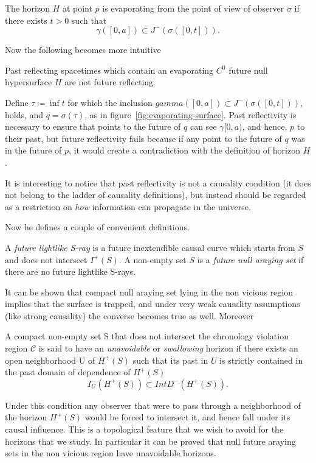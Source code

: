 	\begin{definition}
		The horizon \(H\) at point \(p\) is evaporating from the point of view of observer \(\sigma\) if there exists \(t > 0\) such that
		\[
		\gamma \left([0, a]\right) \subset J^-\left(\sigma\left([0, t]\right)\right).	
		\] 
	\end{definition}
	Now the following becomes more intuitive
	\begin{theorem}
		Past reflecting spacetimes which contain an evaporating \(C^0\) future null hypersurface \(H\) are not future reflecting.
	\end{theorem}
	Define \(\tau \coloneqq \inf t\) for which the inclusion \(gamma \left([0, a]\right) \subset J^-\left(\sigma\left([0, t]\right)\right)\), holds, and \(q = \sigma(\tau)\), as in figure~\ref{fig:evaporating-surface}.
	Past reflectivity is necessary to ensure that points to the future of \(q\) can see \(\gamma[0,a)\), and hence, \(p\) to their past, but future reflectivity fails because if any point to the future of \(q\) was in the future of \(p\), it would create a contradiction with the definition of horizon \(H\). 
	\begin{remark}
		It is interesting to notice that past reflectivity is not a causality condition (it does not belong to the ladder of causality definitions), but instead should be regarded as a restriction on \emph{how} information can propagate in the universe.
	\end{remark}

	Now he defines a couple of convenient definitions.
	\begin{definition}
		A \emph{future lightlike S-ray} is a future inextendible causal curve which starts from \(S\) and does not intersect \(I^+(S)\). A non-empty set \(S\) is a \emph{future null araying set} if there are no future lightlike S-rays. 
	\end{definition}
	It can be shown that compact null araying set lying in the non vicious region implies that the surface is trapped, and under very weak causality assumptions (like strong causality) the converse becomes true as well. Moreover
	\begin{definition}
		A compact non-empty set S that does not intersect the chronology violation region \(\mathcal{C}\) is said to have an \emph{unavoidable} or \emph{swallowing} horizon if there exists an open neighborhood U of \(H^+(S)\) such that its past in \(U\) is strictly contained in the past domain of dependence of \(H^+(S)\) 
		\[
			I^-_U(H^+(S)) \subset Int D^-(H^+(S)).	
		\]
	\end{definition}
	Under this condition any observer that were to pass through a neighborhood of the horizon \(H^+(S)\) would be forced to intersect it, and hence fall under its causal influence. This is a topological feature that we wish to avoid for the horizons that we study. In particular it can be proved that null future araying sets in the non vicious region have unavoidable horizons.

